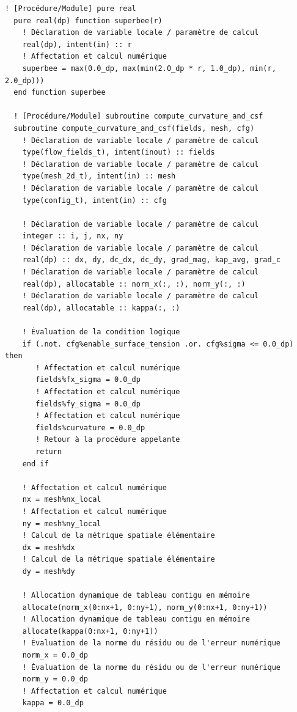 \documentclass[10pt,a4paper,oneside]{book}
\begin{document}
\begin{lstlisting}[language={[95]Fortran}]
  ! [Procédure/Module] pure real
  pure real(dp) function superbee(r)
    ! Déclaration de variable locale / paramètre de calcul
    real(dp), intent(in) :: r
    ! Affectation et calcul numérique
    superbee = max(0.0_dp, max(min(2.0_dp * r, 1.0_dp), min(r, 2.0_dp)))
  end function superbee

  ! [Procédure/Module] subroutine compute_curvature_and_csf
  subroutine compute_curvature_and_csf(fields, mesh, cfg)
    ! Déclaration de variable locale / paramètre de calcul
    type(flow_fields_t), intent(inout) :: fields
    ! Déclaration de variable locale / paramètre de calcul
    type(mesh_2d_t), intent(in) :: mesh
    ! Déclaration de variable locale / paramètre de calcul
    type(config_t), intent(in) :: cfg

    ! Déclaration de variable locale / paramètre de calcul
    integer :: i, j, nx, ny
    ! Déclaration de variable locale / paramètre de calcul
    real(dp) :: dx, dy, dc_dx, dc_dy, grad_mag, kap_avg, grad_c
    ! Déclaration de variable locale / paramètre de calcul
    real(dp), allocatable :: norm_x(:, :), norm_y(:, :)
    ! Déclaration de variable locale / paramètre de calcul
    real(dp), allocatable :: kappa(:, :)

    ! Évaluation de la condition logique
    if (.not. cfg%enable_surface_tension .or. cfg%sigma <= 0.0_dp) then
       ! Affectation et calcul numérique
       fields%fx_sigma = 0.0_dp
       ! Affectation et calcul numérique
       fields%fy_sigma = 0.0_dp
       ! Affectation et calcul numérique
       fields%curvature = 0.0_dp
       ! Retour à la procédure appelante
       return
    end if

    ! Affectation et calcul numérique
    nx = mesh%nx_local
    ! Affectation et calcul numérique
    ny = mesh%ny_local
    ! Calcul de la métrique spatiale élémentaire
    dx = mesh%dx
    ! Calcul de la métrique spatiale élémentaire
    dy = mesh%dy

    ! Allocation dynamique de tableau contigu en mémoire
    allocate(norm_x(0:nx+1, 0:ny+1), norm_y(0:nx+1, 0:ny+1))
    ! Allocation dynamique de tableau contigu en mémoire
    allocate(kappa(0:nx+1, 0:ny+1))
    ! Évaluation de la norme du résidu ou de l'erreur numérique
    norm_x = 0.0_dp
    ! Évaluation de la norme du résidu ou de l'erreur numérique
    norm_y = 0.0_dp
    ! Affectation et calcul numérique
    kappa = 0.0_dp


\end{lstlisting}
\end{document}
